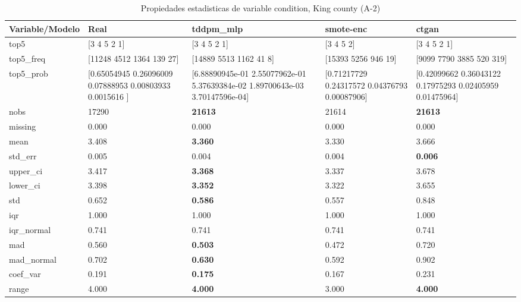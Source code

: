 \begin{table}[H]
\centering
\fontsize{8}{14}\selectfont
\caption{Propiedades  estadisticas de variable condition, King county (A-2)}
\label{table-stats-king county-a-2-condition}
\begin{tabular}{|l|m{10em}|m{10em}|m{10em}|m{10em}|}
\hline
 \rowcolor[gray]{0.8}
Variable/Modelo & Real & tddpm\_mlp & smote-enc & ctgan \\
\hline top5 & [3 4 5 2 1] & [3 4 5 2 1] & [3 4 5 2] & [3 4 5 2 1] \\
\hline top5\_freq & [11248  4512  1364   139    27] & [14889  5513  1162    41     8] & [15393  5256   946    19] & [9099 7790 3885  520  319] \\
\hline top5\_prob & [0.65054945 0.26096009 0.07888953 0.00803933 0.0015616 ] & [6.88890945e-01 2.55077962e-01 5.37639384e-02 1.89700643e-03
 3.70147596e-04] & [0.71217729 0.24317572 0.04376793 0.00087906] & [0.42099662 0.36043122 0.17975293 0.02405959 0.01475964] \\
\hline nobs & 17290 & \bfseries 21613 & \cellcolor[rgb]{0.9, 0.54, 0.52} 21614 & \bfseries 21613 \\
\hline missing & 0.000 & 0.000 & 0.000 & 0.000 \\
\hline mean & 3.408 & \bfseries 3.360 & 3.330 & \cellcolor[rgb]{0.9, 0.54, 0.52} 3.666 \\
\hline std\_err & 0.005 & 0.004 & \cellcolor[rgb]{0.9, 0.54, 0.52} 0.004 & \bfseries 0.006 \\
\hline upper\_ci & 3.417 & \bfseries 3.368 & 3.337 & \cellcolor[rgb]{0.9, 0.54, 0.52} 3.678 \\
\hline lower\_ci & 3.398 & \bfseries 3.352 & 3.322 & \cellcolor[rgb]{0.9, 0.54, 0.52} 3.655 \\
\hline std & 0.652 & \bfseries 0.586 & 0.557 & \cellcolor[rgb]{0.9, 0.54, 0.52} 0.848 \\
\hline iqr & 1.000 & 1.000 & 1.000 & 1.000 \\
\hline iqr\_normal & 0.741 & 0.741 & 0.741 & 0.741 \\
\hline mad & 0.560 & \bfseries 0.503 & 0.472 & \cellcolor[rgb]{0.9, 0.54, 0.52} 0.720 \\
\hline mad\_normal & 0.702 & \bfseries 0.630 & 0.592 & \cellcolor[rgb]{0.9, 0.54, 0.52} 0.902 \\
\hline coef\_var & 0.191 & \bfseries 0.175 & 0.167 & \cellcolor[rgb]{0.9, 0.54, 0.52} 0.231 \\
\hline range & 4.000 & \bfseries 4.000 & \cellcolor[rgb]{0.9, 0.54, 0.52} 3.000 & \bfseries 4.000 \\

\end{tabular}
\end{table}
